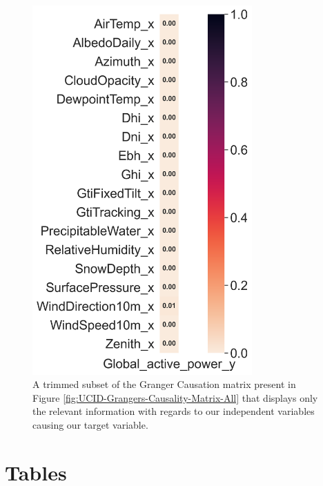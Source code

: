 \begin{figure}[H]
    \centering
    \includegraphics[width=0.75\textwidth]{Images/Chapter 5/UCID/UCID-Grangers-Causality-Matrix-Single.png}
    \caption{A trimmed subset of the Granger Causation matrix present in Figure \ref{fig:UCID-Grangers-Causality-Matrix-All} that displays only the relevant information with regards to our independent variables causing our target variable.}
    \label{fig:UCID-Grangers-Causality-Matrix-Single}
\end{figure}

\section{Tables}
\label{sec:Appendix:Tables}

